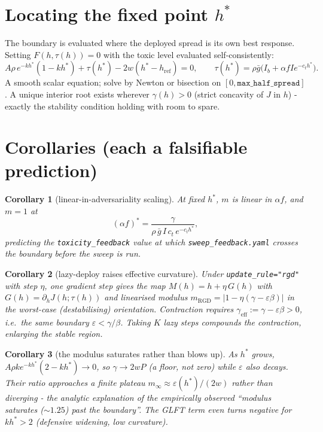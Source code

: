 \documentclass[11pt]{article}
\newtheorem{corollary}{Corollary}
\newcommand{\eps}{\varepsilon}
\newcommand{\gbar}{\bar g}
\newcommand{\href}{h_{\mathrm{ref}}}
\newcommand{\code}[1]{\texttt{#1}}
\begin{document}
\section{Locating the fixed point \texorpdfstring{$h^*$}{h*}}

The boundary is evaluated where the deployed spread is its own best response.
Setting $F(h,\tau(h))=0$ with the toxic level evaluated self-consistently:
%
\begin{equation}\label{eq:fixedpoint}
  A\rho\,e^{-k h^*}(1-k h^*) + \tau(h^*) - 2w(h^*-\href) = 0,
  \qquad \tau(h^*)=\rho\gbar\big(I_b+\alpha f I e^{-c_t h^*}\big).
\end{equation}
%
A smooth scalar equation; solve by Newton or bisection on
$[0,\code{max\_half\_spread}]$. A unique interior root exists wherever
$\gamma(h)>0$ (strict concavity of $J$ in $h$) - exactly the stability
condition holding with room to spare.

\section{Corollaries (each a falsifiable prediction)}

\begin{corollary}[linear-in-adversariality scaling]
At fixed $h^*$, $m$ is linear in $\alpha f$, and $m=1$ at
\begin{equation*}
  (\alpha f)^* = \frac{\gamma}{\rho\,\gbar\,I\,c_t\,e^{-c_t h^*}},
\end{equation*}
predicting the \code{toxicity\_feedback} value at which \code{sweep\_feedback.yaml}
crosses the boundary before the sweep is run.
\end{corollary}

\begin{corollary}[lazy-deploy raises effective curvature]
Under \code{update\_rule="rgd"} with step $\eta$, one gradient step gives the map
$M(h)=h+\eta\,G(h)$ with $G(h)=\partial_h J(h;\tau(h))$ and linearised modulus
$m_{\mathrm{RGD}}=|1-\eta(\gamma-\eps\beta)|$ in the worst-case (destabilising)
orientation. Contraction requires $\gamma_{\mathrm{eff}}:=\gamma-\eps\beta>0$,
i.e.\ the same boundary $\eps<\gamma/\beta$. Taking $K$ lazy steps compounds the
contraction, enlarging the stable region.
\end{corollary}

\begin{corollary}[the modulus saturates rather than blows up]
As $h^*$ grows, $A\rho k e^{-k h^*}(2-k h^*)\to 0$, so $\gamma\to 2wP$ (a floor,
not zero) while $\eps$ also decays. Their ratio approaches a finite plateau
$m_\infty\approx \eps(h^*)/(2w)$ rather than diverging - the analytic
explanation of the empirically observed ``modulus saturates ($\sim 1.25$) past
the boundary''. The GLFT term even turns negative for $k h^*>2$ (defensive
widening, low curvature).
\end{corollary}
\end{document}
